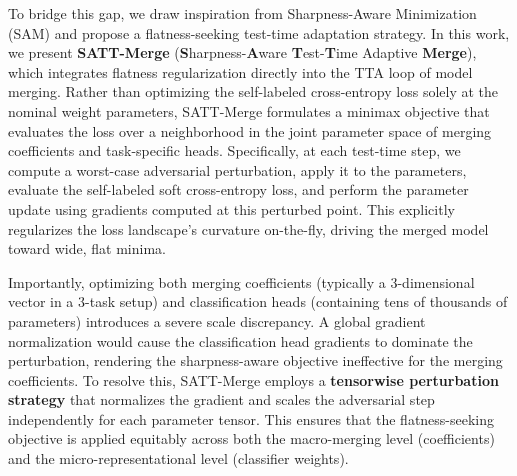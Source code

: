 \documentclass{article}
\begin{document}
To bridge this gap, we draw inspiration from Sharpness-Aware Minimization (SAM) \cite{saim2026, lotfy2023detecting} and propose a flatness-seeking test-time adaptation strategy. In this work, we present \textbf{SATT-Merge} (\textbf{S}harpness-\textbf{A}ware \textbf{T}est-\textbf{T}ime Adaptive \textbf{Merge}), which integrates flatness regularization directly into the TTA loop of model merging. Rather than optimizing the self-labeled cross-entropy loss solely at the nominal weight parameters, SATT-Merge formulates a minimax objective that evaluates the loss over a neighborhood in the joint parameter space of merging coefficients and task-specific heads. Specifically, at each test-time step, we compute a worst-case adversarial perturbation, apply it to the parameters, evaluate the self-labeled soft cross-entropy loss, and perform the parameter update using gradients computed at this perturbed point. This explicitly regularizes the loss landscape's curvature on-the-fly, driving the merged model toward wide, flat minima.

Importantly, optimizing both merging coefficients (typically a $3$-dimensional vector in a $3$-task setup) and classification heads (containing tens of thousands of parameters) introduces a severe scale discrepancy. A global gradient normalization would cause the classification head gradients to dominate the perturbation, rendering the sharpness-aware objective ineffective for the merging coefficients. To resolve this, SATT-Merge employs a \textbf{tensorwise perturbation strategy} that normalizes the gradient and scales the adversarial step independently for each parameter tensor. This ensures that the flatness-seeking objective is applied equitably across both the macro-merging level (coefficients) and the micro-representational level (classifier weights).
\end{document}
